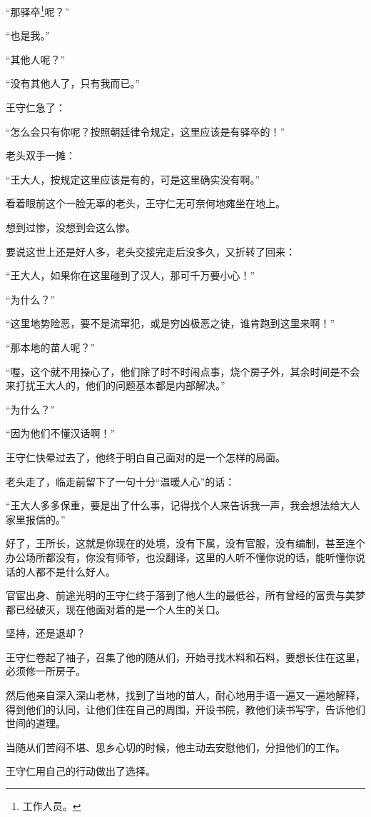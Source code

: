 \begin{multicols}{\theparacolNo}
“那驿卒\footnote{工作人员。}呢？”

“也是我。”

“其他人呢？”

“没有其他人了，只有我而已。”

王守仁急了：

“怎么会只有你呢？按照朝廷律令规定，这里应该是有驿卒的！”

老头双手一摊：

“王大人，按规定这里应该是有的，可是这里确实没有啊。”

看着眼前这个一脸无辜的老头，王守仁无可奈何地瘫坐在地上。

想到过惨，没想到会这么惨。

要说这世上还是好人多，老头交接完走后没多久，又折转了回来：

“王大人，如果你在这里碰到了汉人，那可千万要小心！”

“为什么？”

“这里地势险恶，要不是流窜犯，或是穷凶极恶之徒，谁肯跑到这里来啊！”

“那本地的苗人呢？”

“喔，这个就不用操心了，他们除了时不时闹点事，烧个房子外，其余时间是不会来打扰王大人的，他们的问题基本都是内部解决。”

“为什么？”

“因为他们不懂汉话啊！”

王守仁快晕过去了，他终于明白自己面对的是一个怎样的局面。

老头走了，临走前留下了一句十分“温暖人心”的话：

“王大人多多保重，要是出了什么事，记得找个人来告诉我一声，我会想法给大人家里报信的。”

好了，王所长，这就是你现在的处境，没有下属，没有官服，没有编制，甚至连个办公场所都没有，你没有师爷，也没翻译，这里的人听不懂你说的话，能听懂你说话的人都不是什么好人。

官宦出身、前途光明的王守仁终于落到了他人生的最低谷，所有曾经的富贵与美梦都已经破灭，现在他面对着的是一个人生的关口。

坚持，还是退却？

王守仁卷起了袖子，召集了他的随从们，开始寻找木料和石料，要想长住在这里，必须修一所房子。

然后他亲自深入深山老林，找到了当地的苗人，耐心地用手语一遍又一遍地解释，得到他们的认同，让他们住在自己的周围，开设书院，教他们读书写字，告诉他们世间的道理。

当随从们苦闷不堪、思乡心切的时候，他主动去安慰他们，分担他们的工作。

王守仁用自己的行动做出了选择。


\end{multicols}
